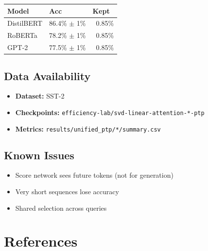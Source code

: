\begin{table}[H]
\centering
\small
\begin{tabular}{lll}
\toprule
\textbf{Model} & \textbf{Acc} & \textbf{Kept} \\
\midrule
DistilBERT & 86.4\% $\pm$ 1\% & ~0.85\% \\
RoBERTa & 78.2\% $\pm$ 1\% & ~0.85\% \\
GPT-2 & 77.5\% $\pm$ 1\% & ~0.85\% \\
\bottomrule
\end{tabular}
\end{table}

\subsection{Data Availability}

\begin{itemize}
\item \textbf{Dataset:} SST-2
\item \textbf{Checkpoints:} \texttt{efficiency-lab/svd-linear-attention-*-ptp}
\item \textbf{Metrics:} \texttt{results/unified\_ptp/*/summary.csv}

\end{itemize}
\subsection{Known Issues}

\begin{itemize}
\item Score network sees future tokens (not for generation)
\item Very short sequences lose accuracy
\item Shared selection across queries

\end{itemize}



\section{References}

